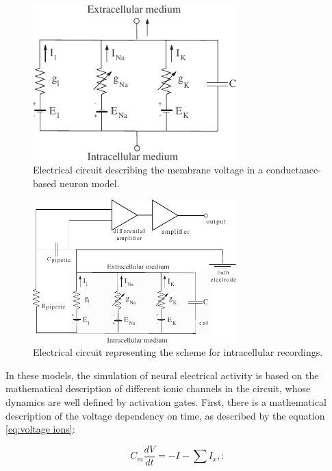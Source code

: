 \begin{figure}[htb!]
	\centering
	\includegraphics[width=0.7\textwidth]{./img/intro/electrical_circuit.pdf}
	\caption{Electrical circuit describing the membrane voltage in a conductance-based neuron model.}
	\label{fig:electrical circuit}
\end{figure}

\begin{figure}[htb!]
	\centering
	\includegraphics[width=0.7\textwidth]{./img/intro/intracellular_recording_circuit.pdf}
	\caption{Electrical circuit representing the scheme for intracellular recordings.}
	\label{fig:clamp circuit}
\end{figure}


In these models, the simulation of neural electrical activity is based on the mathematical description of different ionic channels in the circuit, whose dynamics are well defined by activation gates. First, there is a mathematical description of the voltage dependency on time, as described by the equation \ref{eq:voltage ions}:

\begin{equation}
 C_m \frac{dV}{dt} = -I - \sum I_{x},
  \label{eq:voltage ions}:
\end{equation}


